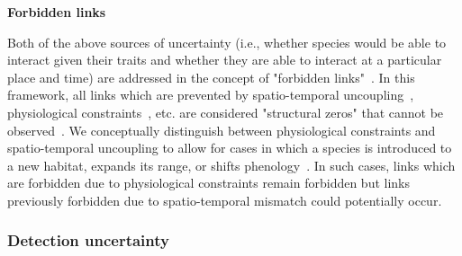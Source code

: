 \documentclass[12pt]{article}
\begin{document}
\begin{spacing}{2.0}

          \textbf{Forbidden links}

            Both of the above sources of uncertainty (i.e., whether species would be able to interact given their traits and whether they are able to interact at a particular place and time) are addressed in the concept of "forbidden links"~\citep{Jordano2016}. In this framework, all links which are prevented by spatio-temporal uncoupling~\citep{Jordano1987}, physiological constraints~\citep{Jordano1987,More2012}, etc. are considered "structural zeros" that cannot be observed~\citep{Jordano2016}. We conceptually distinguish between physiological constraints and spatio-temporal uncoupling to allow for cases in which a species is introduced to a new habitat, expands its range, or shifts phenology~\citep{Gravel2013}. In such cases, links which are forbidden due to physiological constraints remain forbidden but links previously forbidden due to spatio-temporal mismatch could potentially occur. 


        \subsubsection*{Detection uncertainty} 


\end{spacing}
\end{document}
